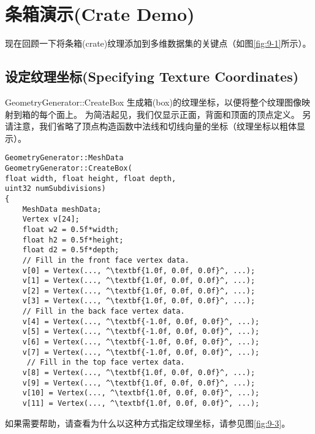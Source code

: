 \section{条箱演示(Crate Demo)}
\begin{flushleft}
现在回顾一下将条箱(crate)纹理添加到多维数据集的关键点（如图\ref{fig:9-1}所示）。
\end{flushleft}

\subsection{设定纹理坐标(Specifying Texture Coordinates)}
\begin{flushleft}
GeometryGenerator::CreateBox 生成箱(box)的纹理坐标，以便将整个纹理图像映射到箱的每个面上。 为简洁起见，我们仅显示正面，背面和顶面的顶点定义。 另请注意，我们省略了顶点构造函数中法线和切线向量的坐标（纹理坐标以粗体显示）。\\
\end{flushleft}

\begin{lstlisting}[escapechar=^]
GeometryGenerator::MeshData
GeometryGenerator::CreateBox(
float width, float height, float depth,
uint32 numSubdivisions)
{
    MeshData meshData;
    Vertex v[24];
    float w2 = 0.5f*width;
    float h2 = 0.5f*height;
    float d2 = 0.5f*depth;
    // Fill in the front face vertex data.
    v[0] = Vertex(..., ^\textbf{1.0f, 0.0f, 0.0f}^, ...);
    v[1] = Vertex(..., ^\textbf{1.0f, 0.0f, 0.0f}^, ...);
    v[2] = Vertex(..., ^\textbf{1.0f, 0.0f, 0.0f}^, ...);
    v[3] = Vertex(..., ^\textbf{1.0f, 0.0f, 0.0f}^, ...);
    // Fill in the back face vertex data.
    v[4] = Vertex(..., ^\textbf{-1.0f, 0.0f, 0.0f}^, ...);
    v[5] = Vertex(..., ^\textbf{-1.0f, 0.0f, 0.0f}^, ...);
    v[6] = Vertex(..., ^\textbf{-1.0f, 0.0f, 0.0f}^, ...);
    v[7] = Vertex(..., ^\textbf{-1.0f, 0.0f, 0.0f}^, ...);
     // Fill in the top face vertex data.
    v[8] = Vertex(..., ^\textbf{1.0f, 0.0f, 0.0f}^, ...);
    v[9] = Vertex(..., ^\textbf{1.0f, 0.0f, 0.0f}^, ...);
    v[10] = Vertex(..., ^\textbf{1.0f, 0.0f, 0.0f}^, ...);
    v[11] = Vertex(..., ^\textbf{1.0f, 0.0f, 0.0f}^, ...);
\end{lstlisting}

\begin{flushleft}
如果需要帮助，请查看为什么以这种方式指定纹理坐标，请参见图\ref{fig:9-3}。
\end{flushleft}

